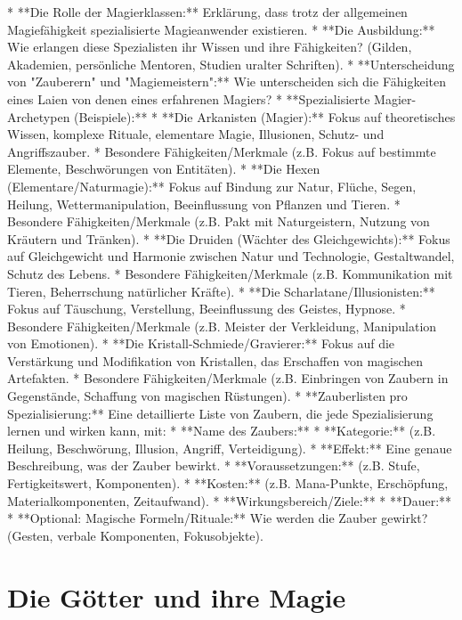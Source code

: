 \documentclass[10pt,a4paper,twocolumn,openany]{book}
\begin{document}
* **Die Rolle der Magierklassen:** Erklärung, dass trotz der allgemeinen Magiefähigkeit spezialisierte Magieanwender existieren.
* **Die Ausbildung:** Wie erlangen diese Spezialisten ihr Wissen und ihre Fähigkeiten? (Gilden, Akademien, persönliche Mentoren, Studien uralter Schriften).
* **Unterscheidung von "Zauberern" und "Magiemeistern":** Wie unterscheiden sich die Fähigkeiten eines Laien von denen eines erfahrenen Magiers?
* **Spezialisierte Magier-Archetypen (Beispiele):**
* **Die Arkanisten (Magier):** Fokus auf theoretisches Wissen, komplexe Rituale, elementare Magie, Illusionen, Schutz- und Angriffszauber.
* Besondere Fähigkeiten/Merkmale (z.B. Fokus auf bestimmte Elemente, Beschwörungen von Entitäten).
* **Die Hexen (Elementare/Naturmagie):** Fokus auf Bindung zur Natur, Flüche, Segen, Heilung, Wettermanipulation, Beeinflussung von Pflanzen und Tieren.
* Besondere Fähigkeiten/Merkmale (z.B. Pakt mit Naturgeistern, Nutzung von Kräutern und Tränken).
* **Die Druiden (Wächter des Gleichgewichts):** Fokus auf Gleichgewicht und Harmonie zwischen Natur und Technologie, Gestaltwandel, Schutz des Lebens.
* Besondere Fähigkeiten/Merkmale (z.B. Kommunikation mit Tieren, Beherrschung natürlicher Kräfte).
* **Die Scharlatane/Illusionisten:** Fokus auf Täuschung, Verstellung, Beeinflussung des Geistes, Hypnose.
* Besondere Fähigkeiten/Merkmale (z.B. Meister der Verkleidung, Manipulation von Emotionen).
* **Die Kristall-Schmiede/Gravierer:** Fokus auf die Verstärkung und Modifikation von Kristallen, das Erschaffen von magischen Artefakten.
* Besondere Fähigkeiten/Merkmale (z.B. Einbringen von Zaubern in Gegenstände, Schaffung von magischen Rüstungen).
* **Zauberlisten pro Spezialisierung:** Eine detaillierte Liste von Zaubern, die jede Spezialisierung lernen und wirken kann, mit:
* **Name des Zaubers:**
* **Kategorie:** (z.B. Heilung, Beschwörung, Illusion, Angriff, Verteidigung).
* **Effekt:** Eine genaue Beschreibung, was der Zauber bewirkt.
* **Voraussetzungen:** (z.B. Stufe, Fertigkeitswert, Komponenten).
* **Kosten:** (z.B. Mana-Punkte, Erschöpfung, Materialkomponenten, Zeitaufwand).
* **Wirkungsbereich/Ziele:**
* **Dauer:**
* **Optional: Magische Formeln/Rituale:** Wie werden die Zauber gewirkt? (Gesten, verbale Komponenten, Fokusobjekte).

\chapter{Die Götter und ihre Magie}
\end{document}
